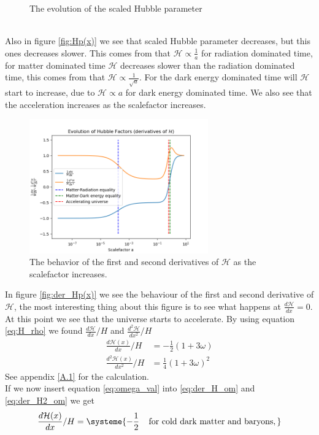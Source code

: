 \documentclass{article}
\begin{document}
\begin{multicols}{2}
\begin{figure}[H]
	\caption{The evolution of the scaled Hubble parameter}
	\label{fig:Hp(x)}
\end{figure}
\\
Also in figure \eqref{fig:Hp(x)} we see that scaled Hubble parameter decreases, but this ones decreases slower. This comes from that $\mathcal{H}\propto \frac{1}{a}$ for radiation dominated time, for matter dominated time $\mathcal{H}$ decreases slower than the  radiation dominated time, this comes from that $\mathcal{H}\propto \frac{1}{\sqrt{a}}$. For the dark energy dominated time will $\mathcal{H}$ start to increase, due to $\mathcal{H}\propto {a}$ for dark energy dominated time. We also see that the acceleration increases as the scalefactor increases. 
\begin{figure}[H]
	\centering
	\includegraphics[width=77mm]{der_Hp.png}
	\caption{The behavior of the first and second derivatives of $\mathcal{H}$ as the scalefactor increases.}
	\label{fig:der_Hp(x)}
\end{figure}
In figure \eqref{fig:der_Hp(x)} we see the behaviour of the first and second derivative of $\mathcal{H}$, the most interesting thing about this figure is to see what happens at $\frac{d\mathcal{H}}{dx}=0$. At this point we see that the universe starts to accelerate. By using equation \eqref{eq:H_rho} we found $\frac{d\mathcal{H}}{dx}/H$ and $\frac{d^2\mathcal{H}}{dx^2}/H$
\begin{align}
    \frac{d\mathcal{H}(x)}{dx}/H&=-\frac{1}{2}(1+3\omega) \label{eq:der_H_om}\\
    \frac{d^2\mathcal{H}(x)}{dx^2}/H&=\frac{1}{4}(1+3\omega)^2 \label{eq:der_H2_om}
\end{align}
See appendix \eqref{A.1} for the calculation.\\
If we now insert equation \eqref{eq:omega_val} into \eqref{eq:der_H_om} and \eqref{eq:der_H2_om} we get
\begin{equation}
\frac{d\mathcal{H}(x)}{dx}/H=
\systeme{
  -\frac{1}{2}\;\;\;\; \text{for cold dark matter and baryons},
}
\end{equation}
\end{multicols}
\end{document}
